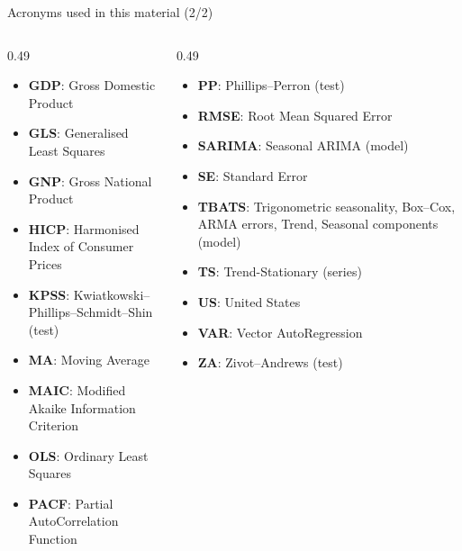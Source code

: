 \begin{frame}{Acronyms used in this material (2/2)}
\begin{columns}[T]
\begin{column}{0.49\textwidth}
\begin{itemize}\setlength{\itemsep}{0pt}
    \item \textbf{GDP}: Gross Domestic Product
    \item \textbf{GLS}: Generalised Least Squares
    \item \textbf{GNP}: Gross National Product
    \item \textbf{HICP}: Harmonised Index of Consumer Prices
    \item \textbf{KPSS}: Kwiatkowski–Phillips–Schmidt–Shin (test)
    \item \textbf{MA}: Moving Average
    \item \textbf{MAIC}: Modified Akaike Information Criterion
    \item \textbf{OLS}: Ordinary Least Squares
    \item \textbf{PACF}: Partial AutoCorrelation Function
\end{itemize}
\end{column}
\begin{column}{0.49\textwidth}
\begin{itemize}\setlength{\itemsep}{0pt}
    \item \textbf{PP}: Phillips–Perron (test)
    \item \textbf{RMSE}: Root Mean Squared Error
    \item \textbf{SARIMA}: Seasonal ARIMA (model)
    \item \textbf{SE}: Standard Error
    \item \textbf{TBATS}: Trigonometric seasonality, Box–Cox, ARMA errors, Trend, Seasonal components (model)
    \item \textbf{TS}: Trend-Stationary (series)
    \item \textbf{US}: United States
    \item \textbf{VAR}: Vector AutoRegression
    \item \textbf{ZA}: Zivot–Andrews (test)
\end{itemize}
\end{column}
\end{columns}
\end{frame}

